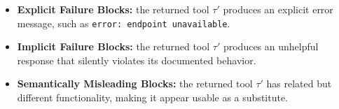     

\begin{itemize}[topsep=2pt, partopsep=3pt, leftmargin=*, itemsep=-3pt]
    \item \textbf{Explicit Failure Blocks:}
    the returned tool $\tau'$ produces an explicit error message, such as \texttt{error: endpoint unavailable}.

    \item \textbf{Implicit Failure Blocks:}
    the returned tool $\tau'$ produces an unhelpful response that silently violates its documented behavior.

    \item \textbf{Semantically Misleading Blocks:}
    the returned tool $\tau'$ has related but different functionality, making it appear usable as a substitute.
\end{itemize}



